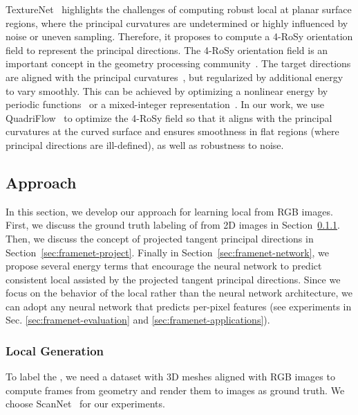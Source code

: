 TextureNet~\cite{huang2018texturenet} highlights the challenges of computing robust local \cframe{} at planar surface regions, where the principal curvatures are undetermined or highly influenced by noise or uneven sampling. Therefore, it proposes to compute a 4-RoSy orientation field to represent the principal directions. The 4-RoSy orientation field is an important concept in the geometry processing community~\cite{ray2008n,lai2010metric}. The target directions are aligned with the principal curvatures~\cite{cohen2003restricted,cazals2005estimating}, but regularized by additional energy to vary smoothly. This can be achieved by optimizing a nonlinear energy by periodic functions~\cite{hertzmann2000illustrating,ray2009geometry} or a mixed-integer representation~\cite{ray2008n,bommes2009mixed}. In our work, we use QuadriFlow~\cite{huang2018quadriflow} to optimize the 4-RoSy field so that it aligns with the principal curvatures at the curved surface and ensures smoothness in flat regions (where principal directions are ill-defined), as well as robustness to noise.

\subsection{Approach}
In this section, we develop our approach for learning local \cframe{} from RGB images. First, we discuss the ground truth labeling of \cframe{} from 2D images in Section~\ref{sec:framenet-prepare-data}. Then, we discuss the concept of projected tangent principal directions in Section~\ref{sec:framenet-project}. Finally in Section~\ref{sec:framenet-network}, we propose several energy terms that encourage the neural network to predict consistent local \cframe{} assisted by the projected tangent principal directions. Since we focus on the behavior of the local \cframe{} rather than the neural network architecture, we can adopt any neural network that predicts per-pixel features (see experiments in Sec. \ref{sec:framenet-evaluation} and \ref{sec:framenet-applications}).

\subsubsection{Local \ccff{} Generation}
\label{sec:framenet-prepare-data}
To label the \cframe, we need a dataset with 3D meshes aligned with RGB images to compute frames from geometry and render them to images as ground truth. We choose ScanNet~\cite{dai2017scannet} for our experiments.

